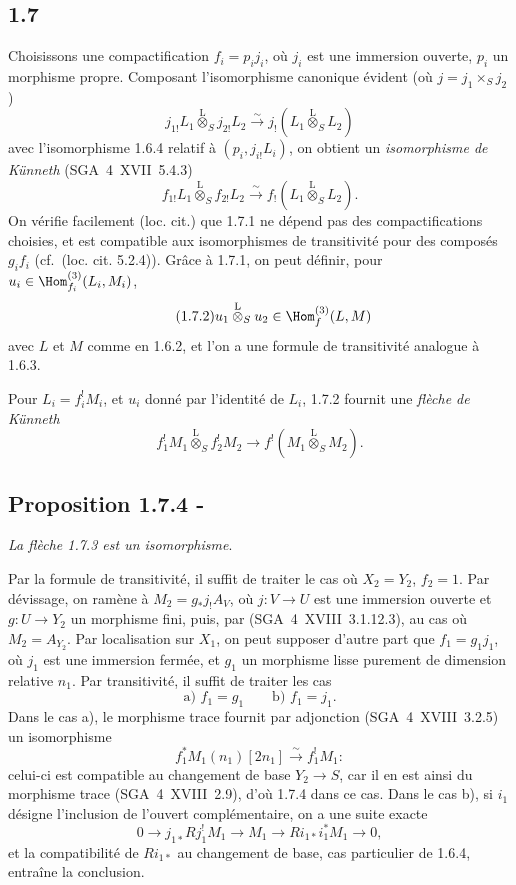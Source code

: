 \subsection*{1.7}
Choisissons une compactification $f_i=p_i j_i$, où $j_i$ est une immersion ouverte, $p_i$ un morphisme propre. Composant l'isomorphisme canonique évident (où $j=j_1\times_S j_2$)
\[
j_{1!}L_1\overset{\mathrm{L}}{\otimes}_{S}j_{2!}L_2\xrightarrow{\sim}j_{!}(L_1\overset{\mathrm{L}}{\otimes}_{S}L_2)
\]
avec l'isomorphisme 1.6.4 relatif à $(p_i,j_{i!}L_i)$, on obtient un \emph{isomorphisme de Künneth} (SGA~4~XVII~5.4.3)
\begin{equation}\tag{1.7.1}
f_{1!}L_1\overset{\mathrm{L}}{\otimes}_{S}f_{2!}L_2\xrightarrow{\sim}f_{!}(L_1\overset{\mathrm{L}}{\otimes}_{S}L_2).
\end{equation}
On vérifie facilement (loc. cit.) que 1.7.1 ne dépend pas des compactifications choisies, et est compatible aux isomorphismes de transitivité pour des composés $g_if_i$ (cf.~(loc. cit. 5.2.4)). Grâce à 1.7.1, on peut définir, pour $u_i\in\Hom_{f_i}^{(3)}(L_i,M_i)$,
\begin{equation}\tag{1.7.2}
u_1\overset{\mathrm{L}}{\otimes}_{S}u_2\in\Hom_f^{(3)}(L,M)
\end{equation}
avec $L$ et $M$ comme en 1.6.2, et l'on a une formule de transitivité analogue à 1.6.3.

Pour $L_i=f_i^{!}M_i$, et $u_i$ donné par l'identité de $L_i$, 1.7.2 fournit une \emph{flèche de Künneth}
\begin{equation}\tag{1.7.3}
f_1^{!}M_1\overset{\mathrm{L}}{\otimes}_{S}f_2^{!}M_2\longrightarrow f^{!}(M_1\overset{\mathrm{L}}{\otimes}_{S}M_2).
\end{equation}

\subsection*{Proposition 1.7.4 -}
\emph{La flèche 1.7.3 est un isomorphisme}.

Par la formule de transitivité, il suffit de traiter le cas où $X_2=Y_2$, $f_2=1$. Par dévissage, on ramène à $M_2=g_{*}j_{!}A_V$, où $j:V\to U$ est une immersion ouverte et $g:U\to Y_2$ un morphisme fini, puis, par (SGA~4~XVIII~3.1.12.3), au cas où $M_2=A_{Y_2}$. Par localisation sur $X_1$, on peut supposer d'autre part que $f_1=g_1j_1$, où $j_1$ est une immersion fermée, et $g_1$ un morphisme lisse purement de dimension relative $n_1$. Par transitivité, il suffit de traiter les cas
\[
\text{a) } f_1=g_1\qquad \text{b) } f_1=j_1.
\]
Dans le cas a), le morphisme trace fournit par adjonction (SGA~4~XVIII~3.2.5) un isomorphisme
\[
f_1^{*}M_1(n_1)[2n_1]\xrightarrow{\sim}f_1^{!}M_1 :
\]
celui-ci est compatible au changement de base $Y_2\to S$, car il en est ainsi du morphisme trace (SGA~4~XVIII~2.9), d'où 1.7.4 dans ce cas. Dans le cas b), si $i_1$ désigne l'inclusion de l'ouvert complémentaire, on a une suite exacte
\[
0\longrightarrow j_{1*}Rj_1^{!}M_1\longrightarrow M_1\longrightarrow Ri_{1*}i_1^{*}M_1\longrightarrow0,
\]
et la compatibilité de $Ri_{1*}$ au changement de base, cas particulier de 1.6.4, entraîne la conclusion.

